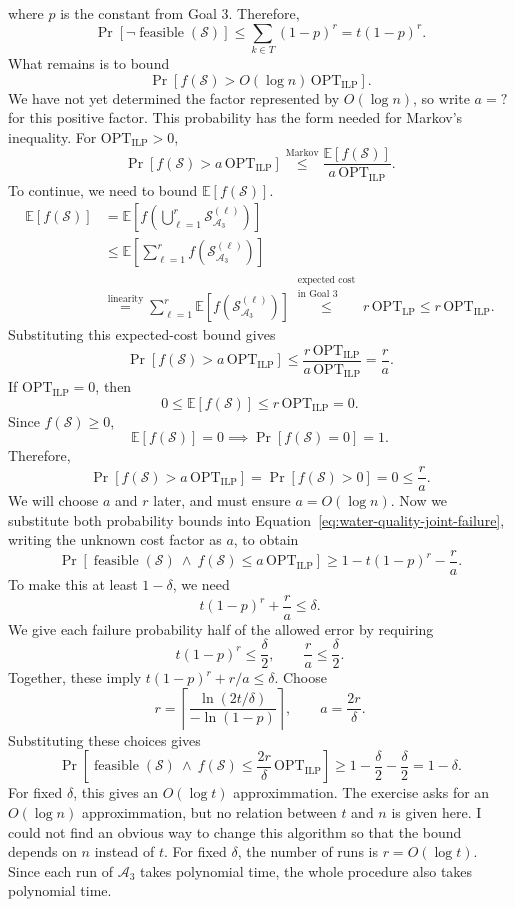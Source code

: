\documentclass[12pt,a4paper]{article}
\begin{document}
where $p$ is the constant from Goal 3.
Therefore,
\[
\Pr[\neg\operatorname{feasible}(\mathcal{S})]
\leq\sum_{k\in T}(1-p)^r=t(1-p)^r.
\]
What remains is to bound
\[
\Pr\!\left[f(\mathcal{S})>O(\log n)\,\mathrm{OPT}_{\mathrm{ILP}}\right].
\]
We have not yet determined the factor represented by $O(\log n)$,
so write $a=?$ for this positive factor. This probability has the form
needed for Markov's inequality. For $\mathrm{OPT}_{\mathrm{ILP}}>0$,
\[
\Pr\!\left[f(\mathcal{S})>a\,\mathrm{OPT}_{\mathrm{ILP}}\right]
\overset{\text{Markov}}{\leq}
\frac{\mathbb{E}[f(\mathcal{S})]}{a\,\mathrm{OPT}_{\mathrm{ILP}}}.
\]
To continue, we need to bound $\mathbb{E}[f(\mathcal{S})]$.
\[
\begin{aligned}
\mathbb{E}[f(\mathcal{S})]
&=\mathbb{E}\!\left[f\!\left(\bigcup_{\ell=1}^r
\mathcal{S}_{\mathcal{A}_3}^{(\ell)}\right)\right]\\
&\leq\mathbb{E}\!\left[\sum_{\ell=1}^r
f(\mathcal{S}_{\mathcal{A}_3}^{(\ell)})\right]\\
&\overset{\text{linearity}}{=}\sum_{\ell=1}^r
\mathbb{E}[f(\mathcal{S}_{\mathcal{A}_3}^{(\ell)})]
\overset{\substack{\text{expected cost}\\\text{in Goal 3}}}{\leq}
r\,\mathrm{OPT}_{\mathrm{LP}}
\leq r\,\mathrm{OPT}_{\mathrm{ILP}}.
\end{aligned}
\]
Substituting this expected-cost bound gives
\[
\Pr\!\left[f(\mathcal{S})>a\,\mathrm{OPT}_{\mathrm{ILP}}\right]
\leq\frac{r\,\mathrm{OPT}_{\mathrm{ILP}}}{a\,\mathrm{OPT}_{\mathrm{ILP}}}
=\frac{r}{a}.
\]
If $\mathrm{OPT}_{\mathrm{ILP}}=0$, then
\[
0\leq\mathbb{E}[f(\mathcal{S})]
\leq r\,\mathrm{OPT}_{\mathrm{ILP}}=0.
\]
Since $f(\mathcal{S})\geq0$,
\[
\mathbb{E}[f(\mathcal{S})]=0
\implies\Pr[f(\mathcal{S})=0]=1.
\]
Therefore,
\[
\Pr[f(\mathcal{S})>a\,\mathrm{OPT}_{\mathrm{ILP}}]
=\Pr[f(\mathcal{S})>0]=0\leq\frac ra.
\]
We will choose $a$ and $r$ later, and must ensure
$a=O(\log n)$.
Now we substitute both probability bounds into
Equation~\eqref{eq:water-quality-joint-failure}, writing the unknown cost
factor as $a$, to obtain
\[
\Pr\!\left[\operatorname{feasible}(\mathcal{S})
\ \land\ f(\mathcal{S})\leq a\,\mathrm{OPT}_{\mathrm{ILP}}\right]
\geq1-t(1-p)^r-\frac ra.
\]
To make this at least $1-\delta$, we need
\[
t(1-p)^r+\frac ra\leq\delta.
\]
We give each failure probability half of the allowed error by requiring
\[
t(1-p)^r\leq\frac\delta2,
\qquad\frac ra\leq\frac\delta2.
\]
Together, these imply $t(1-p)^r+r/a\leq\delta$. Choose
\[
r=\left\lceil\frac{\ln(2t/\delta)}{-\ln(1-p)}\right\rceil,
\qquad a=\frac{2r}{\delta}.
\]
Substituting these choices gives
\[
\Pr\!\left[\operatorname{feasible}(\mathcal{S})
\ \land\ f(\mathcal{S})\leq\frac{2r}{\delta}\,\mathrm{OPT}_{\mathrm{ILP}}\right]
\geq1-\frac\delta2-\frac\delta2=1-\delta.
\]
For fixed $\delta$, this gives an $O(\log t)$ approximmation. The exercise
asks for an $O(\log n)$ approximmation, but no relation between $t$ and $n$
is given here. I could not find an obvious way to change this algorithm
so that the bound depends on $n$ instead of $t$.
For fixed $\delta$, the number of runs is $r=O(\log t)$. Since each run
of $\mathcal{A}_3$ takes polynomial time, the whole procedure also takes
polynomial time.
\end{document}
